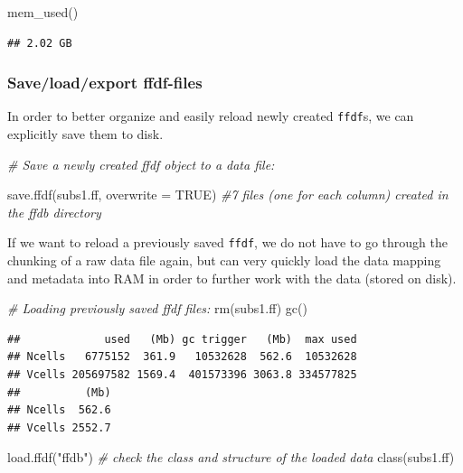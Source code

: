 \documentclass[
  12pt,
]{style/krantz}
\newenvironment{Shaded}{\begin{snugshade}}{\end{snugshade}}
\newcommand{\AttributeTok}[1]{\textcolor[rgb]{0.77,0.63,0.00}{#1}}
\newcommand{\CommentTok}[1]{\textcolor[rgb]{0.56,0.35,0.01}{\textit{#1}}}
\newcommand{\ConstantTok}[1]{\textcolor[rgb]{0.00,0.00,0.00}{#1}}
\newcommand{\FunctionTok}[1]{\textcolor[rgb]{0.00,0.00,0.00}{#1}}
\newcommand{\NormalTok}[1]{#1}
\newcommand{\StringTok}[1]{\textcolor[rgb]{0.31,0.60,0.02}{#1}}
\begin{document}
\begin{Shaded}
\begin{Highlighting}[]
\FunctionTok{mem\_used}\NormalTok{()}
\end{Highlighting}
\end{Shaded}

\begin{verbatim}
## 2.02 GB
\end{verbatim}

\hypertarget{saveloadexport-ffdf-files}{%
\subsubsection{Save/load/export ffdf-files}\label{saveloadexport-ffdf-files}}

In order to better organize and easily reload newly created \texttt{ffdf}s, we can explicitly save them to disk.

\begin{Shaded}
\begin{Highlighting}[]
\CommentTok{\# Save a newly created ffdf object to a data file:}

\FunctionTok{save.ffdf}\NormalTok{(subs1.ff, }\AttributeTok{overwrite =} \ConstantTok{TRUE}\NormalTok{) }\CommentTok{\#7 files (one for each column) created in the ffdb directory}
\end{Highlighting}
\end{Shaded}

If we want to reload a previously saved \texttt{ffdf}, we do not have to go through the chunking of a raw data file again, but can very quickly load the data mapping and metadata into RAM in order to further work with the data (stored on disk).

\begin{Shaded}
\begin{Highlighting}[]
\CommentTok{\# Loading previously saved ffdf files:}
\FunctionTok{rm}\NormalTok{(subs1.ff)}
\FunctionTok{gc}\NormalTok{()}
\end{Highlighting}
\end{Shaded}

\begin{verbatim}
##             used   (Mb) gc trigger   (Mb)  max used
## Ncells   6775152  361.9   10532628  562.6  10532628
## Vcells 205697582 1569.4  401573396 3063.8 334577825
##          (Mb)
## Ncells  562.6
## Vcells 2552.7
\end{verbatim}

\begin{Shaded}
\begin{Highlighting}[]
\FunctionTok{load.ffdf}\NormalTok{(}\StringTok{"ffdb"}\NormalTok{)}
\CommentTok{\# check the class and structure of the loaded data}
\FunctionTok{class}\NormalTok{(subs1.ff) }
\end{Highlighting}
\end{Shaded}
\end{document}
